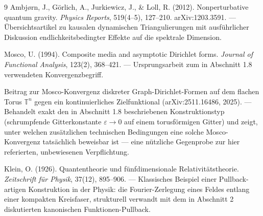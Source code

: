\begin{thebibliography}{9}
Ambjørn, J., Görlich, A., Jurkiewicz, J., \& Loll, R. (2012). Nonperturbative
quantum gravity. \emph{Physics Reports}, 519(4--5), 127--210.
arXiv:1203.3591. — Übersichtsartikel zu kausalen dynamischen
Triangulierungen mit ausführlicher Diskussion endlichkeitsbedingter
Effekte auf die spektrale Dimension.

Mosco, U. (1994). Composite media and asymptotic Dirichlet forms.
\emph{Journal of Functional Analysis}, 123(2), 368--421. — Ursprungsarbeit
zum in Abschnitt 1.8 verwendeten Konvergenzbegriff.

Beitrag zur Mosco-Konvergenz diskreter Graph-Dirichlet-Formen auf dem
flachen Torus $\mathbb{T}^n$ gegen ein kontinuierliches Zielfunktional
(arXiv:2511.16486, 2025). — Behandelt exakt den in Abschnitt 1.8
beschriebenen Konstruktionstyp (schrumpfende Gitterkonstante $\varepsilon\to0$
auf einem torusförmigen Gitter) und zeigt, unter welchen zusätzlichen
technischen Bedingungen eine solche Mosco-Konvergenz tatsächlich beweisbar
ist — eine nützliche Gegenprobe zur hier referierten, unbewiesenen
Verpflichtung.

Klein, O. (1926). Quantentheorie und fünfdimensionale Relativitätstheorie.
\emph{Zeitschrift für Physik}, 37(12), 895--906. — Klassisches Beispiel
einer Pullback-artigen Konstruktion in der Physik: die Fourier-Zerlegung
eines Feldes entlang einer kompakten Kreisfaser, strukturell verwandt mit
dem in Abschnitt 2 diskutierten kanonischen Funktionen-Pullback.
\end{thebibliography}
